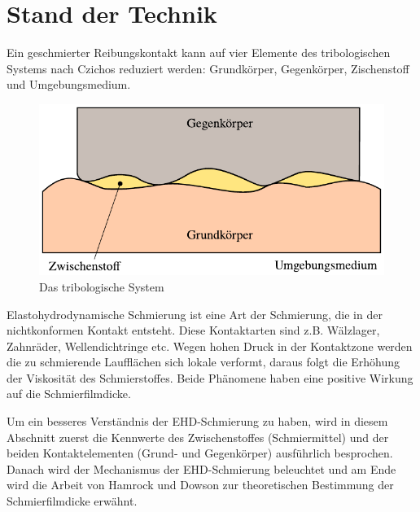 \chapter{Stand der Technik}
\label{chap:stand_der_technik}

Ein geschmierter Reibungskontakt kann auf vier Elemente des tribologischen Systems nach Czichos\cite{czichos} reduziert werden: Grundkörper, Gegenkörper, Zischenstoff und Umgebungsmedium.
\begin{figure}[htb]
    \centering
    \includegraphics[]{./images/tribologisches_system.pdf}
    \caption{Das tribologische System\cite{wisniewski}}
    \label{fig:das_tribologische_system}
\end{figure}

Elastohydrodynamische Schmierung ist eine Art der Schmierung, die in der nichtkonformen Kontakt entsteht.
Diese Kontaktarten sind z.B. Wälzlager, Zahnräder, Wellendichtringe etc.
Wegen hohen Druck in der Kontaktzone werden die zu schmierende Laufflächen sich lokale verformt, daraus folgt die Erhöhung der Viskosität des Schmierstoffes.
Beide Phänomene haben eine positive Wirkung auf die Schmierfilmdicke.

Um ein besseres Verständnis der EHD-Schmierung zu haben, wird in diesem Abschnitt zuerst die Kennwerte des Zwischenstoffes (Schmiermittel) und der beiden Kontaktelementen (Grund- und Gegenkörper) ausführlich besprochen.
Danach wird der Mechanismus der EHD-Schmierung beleuchtet und am Ende wird die Arbeit von Hamrock und Dowson zur theoretischen Bestimmung der Schmierfilmdicke erwähnt.


